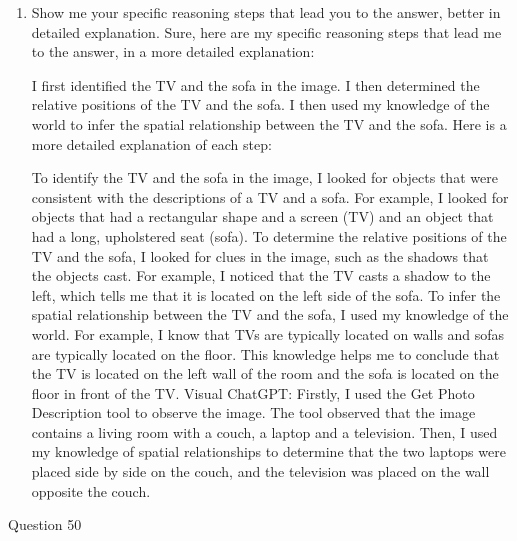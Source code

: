 \begin{enumerate}
    Here are some additional details about the spatial relationship between the TV and the sofa:
    
    The TV is a large, electronic device that is used to display moving images.
    The sofa is a long, upholstered piece of furniture that is designed for sitting.
    The TV is located on a wall, which is a vertical surface that typically separates two rooms.
    The sofa is located on the floor, which is a horizontal surface that is typically covered in carpeting.
    \subitem Visual ChatGPT: The television is placed on the wall opposite the couch.
    \item Show me your specific reasoning steps that lead you to the answer, better in detailed explanation.
    \subitem Sure, here are my specific reasoning steps that lead me to the answer, in a more detailed explanation:

    I first identified the TV and the sofa in the image.
    I then determined the relative positions of the TV and the sofa.
    I then used my knowledge of the world to infer the spatial relationship between the TV and the sofa.
    Here is a more detailed explanation of each step:
    
    To identify the TV and the sofa in the image, I looked for objects that were consistent with the descriptions of a TV and a sofa. For example, I looked for objects that had a rectangular shape and a screen (TV) and an object that had a long, upholstered seat (sofa).
    To determine the relative positions of the TV and the sofa, I looked for clues in the image, such as the shadows that the objects cast. For example, I noticed that the TV casts a shadow to the left, which tells me that it is located on the left side of the sofa.
    To infer the spatial relationship between the TV and the sofa, I used my knowledge of the world. For example, I know that TVs are typically located on walls and sofas are typically located on the floor. This knowledge helps me to conclude that the TV is located on the left wall of the room and the sofa is located on the floor in front of the TV.
    \subitem Visual ChatGPT: Firstly, I used the Get Photo Description tool to observe the image. The tool observed that the image contains a living room with a couch, a laptop and a television. Then, I used my knowledge of spatial relationships to determine that the two laptops were placed side by side on the couch, and the television was placed on the wall opposite the couch.
\end{enumerate}
Question 50\\
